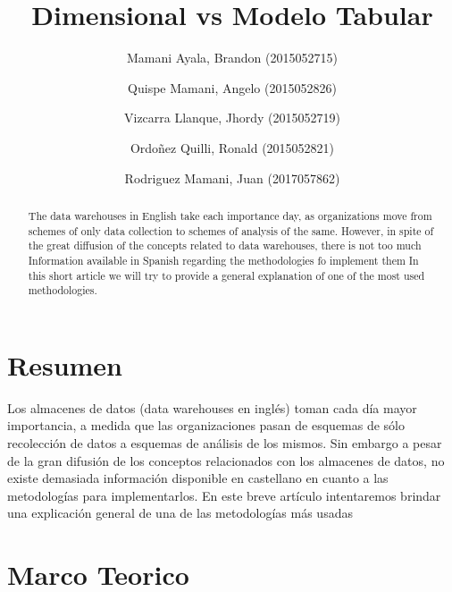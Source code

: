 \documentclass[preprint,12pt]{elsarticle}
\begin{document}
	
	\begin{frontmatter}
		
		
		\title{\huge Dimensional vs Modelo Tabular}
		
		\author{Mamani Ayala, Brandon        (2015052715)}
		\author{Quispe Mamani, Angelo	      (2015052826)}
		\author{Vizcarra Llanque, Jhordy	      (2015052719)}
		\author{Ordoñez Quilli, Ronald          (2015052821)}
		\author{Rodriguez Mamani, Juan      (2017057862)}
		
		\address{Tacna, Perú}
		
		\begin{abstract}
			
The data warehouses in English take each importance day, as organizations move from schemes of only data collection to schemes of analysis of the same. However, in spite of the great diffusion of the concepts related to data warehouses, there is not too much Information available in Spanish regarding the methodologies fo implement them In this short article we will try to provide a general explanation of one of the most used methodologies. 
		\end{abstract}
\end{frontmatter}

	
	
	\section{Resumen}
Los almacenes de datos (data warehouses en inglés) toman cada día mayor importancia, a medida que las organizaciones pasan de esquemas de sólo recolección de datos a esquemas de análisis de los mismos. Sin embargo a pesar de la gran difusión de los conceptos relacionados con los almacenes de datos, no existe demasiada información disponible en castellano en cuanto a las metodologías para implementarlos. En este breve artículo intentaremos brindar una explicación general de una de las metodologías más usadas \\
	
	



	
	

\section{Marco Teorico}
\end{document}
